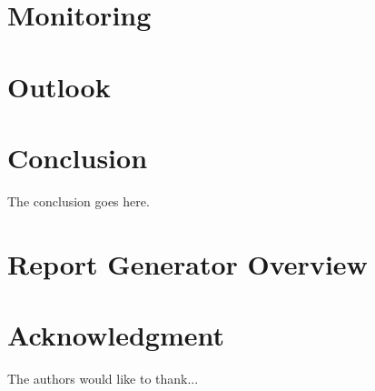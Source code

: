 \documentclass[journal]{IEEEtran}
\begin{document}
\section{Monitoring}









\section{Outlook}




\section{Conclusion}

The conclusion goes here.



\section{Report Generator Overview}





\section*{Acknowledgment}

The authors would like to thank...

\ifCLASSOPTIONcaptionsoff

  \newpage

\fi





\printbibliography
\end{document}

